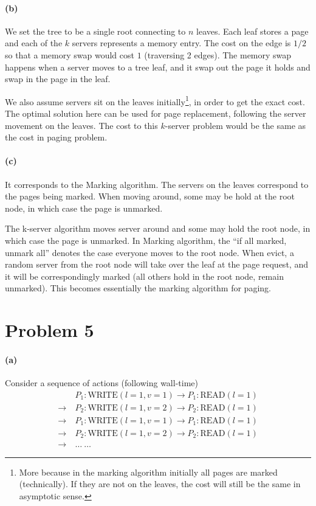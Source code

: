 \documentclass[12pt]{article}
\begin{document}
\paragraph{(b)} We set the tree to be a single root connecting to $n$ leaves. Each leaf stores a page and each of the $k$ servers represents a memory entry. The cost on the edge is $1/2$ so that a memory swap would cost $1$ (traversing 2 edges). The memory swap happens when a server moves to a tree leaf, and it swap out the page it holds and swap in the page in the leaf. 

We also assume servers sit on the leaves initially\footnote{More because in the marking algorithm initially all pages are marked (technically). If they are not on the leaves, the cost will still be the same in asymptotic sense.}, in order to get the exact cost. The optimal solution here can be used for page replacement, following the server movement on the leaves. The cost to this $k$-server problem would be the same as the cost in paging problem. 

\paragraph{(c)} It corresponds to the Marking algorithm. The servers on the leaves correspond to the pages being marked. When moving around, some may be hold at the root node, in which case the page is unmarked. 

The k-server algorithm moves server around and some may hold the root node, in which case the page is unmarked. In Marking algorithm, the ``if all marked, unmark all'' denotes the case everyone moves to the root node. When evict, a random server from the root node will take over the leaf at the page request, and it will be correspondingly marked (all others hold in the root node, remain unmarked). This becomes essentially the marking algorithm for paging.

\pagebreak
\section*{Problem 5}
\paragraph{(a)} Consider a sequence of actions (following wall-time) 
\begin{align*}
&P_1: \text{WRITE}(l=1, v=1) \to P_1: \text{READ}(l=1) \\
\to \: &P_2: \text{WRITE}(l=1, v=2) \to P_2: \text{READ}(l=1) \\
\to\: &P_1: \text{WRITE}(l=1, v=1) \to P_1: \text{READ}(l=1) \\
\to \: &P_2: \text{WRITE}(l=1, v=2) \to P_2: \text{READ}(l=1)\\
\to\: & \dots \: \dots
\end{align*}
\end{document}
